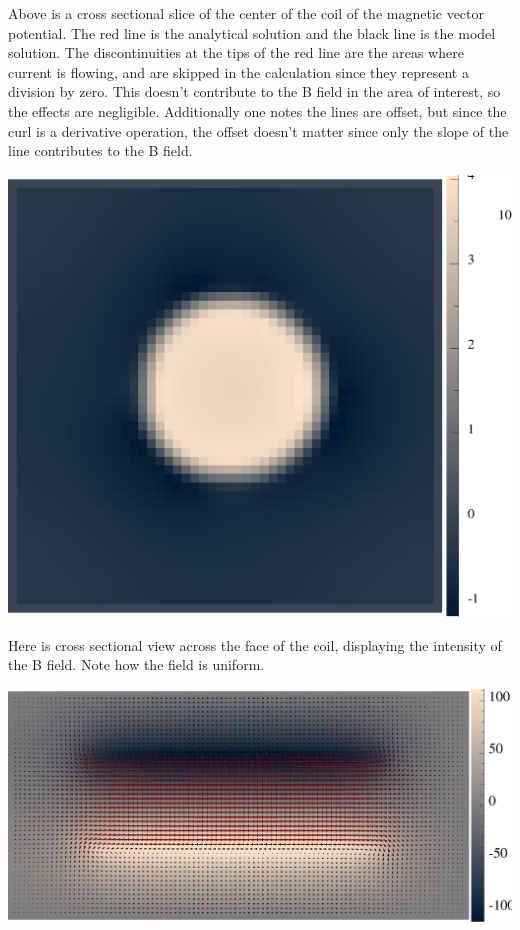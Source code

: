 \documentclass[12pt,a4paper]{article}
\begin{document}
Above is a cross sectional slice of the center of the coil of the magnetic vector potential. The red line is the analytical solution and the black line is the model solution. The discontinuities at the tips of the red line are the areas where current is flowing, and are skipped in the calculation since they represent a division by zero. This doesn't contribute to the B field in the area of interest, so the effects are negligible. Additionally one notes the lines are offset, but since the curl is a derivative operation, the offset doesn't matter since only the slope of the line contributes to the B field.

\includegraphics[scale=.7]{Simulations/Bfield-Face.eps} 

Here is cross sectional view across the face of the coil, displaying the intensity of the B field. Note how the field is uniform.

\includegraphics[scale=.7]{Simulations/Coil-and-B-field.eps} 
\end{document}
